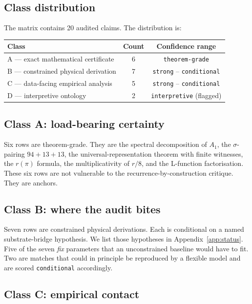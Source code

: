 \documentclass[11pt,a4paper]{article}
\begin{document}
\subsection{Class distribution}

The matrix contains 20 audited claims. The distribution is:

\begin{center}
\begin{tabular}{lcc}
\toprule
\textbf{Class} & \textbf{Count} & \textbf{Confidence range} \\
\midrule
A --- exact mathematical certificate     & 6 & \texttt{theorem-grade} \\
B --- constrained physical derivation   & 7 & \texttt{strong} -- \texttt{conditional} \\
C --- data-facing empirical analysis    & 5 & \texttt{strong} -- \texttt{conditional} \\
D --- interpretive ontology             & 2 & \texttt{interpretive} (flagged) \\
\bottomrule
\end{tabular}
\end{center}

\subsection{Class A: load-bearing certainty}

Six rows are theorem-grade. They are the spectral decomposition of
$A_1$, the $\sigma$-pairing $94+13+13$, the universal-representation
theorem with finite witnesses, the $r(\pi)$ formula, the
multiplicativity of $r/8$, and the L-function factorisation. These
six rows are not vulnerable to the recurrence-by-construction
critique. They are anchors.

\subsection{Class B: where the audit bites}

Seven rows are constrained physical derivations. Each is
conditional on a named substrate-bridge hypothesis. We list those
hypotheses in Appendix~\ref{app:status}. Five of the seven
\emph{fix} parameters that an unconstrained baseline would have to
fit. Two are matches that could in principle be reproduced by a
flexible model and are scored \texttt{conditional} accordingly.

\subsection{Class C: empirical contact}
\end{document}
